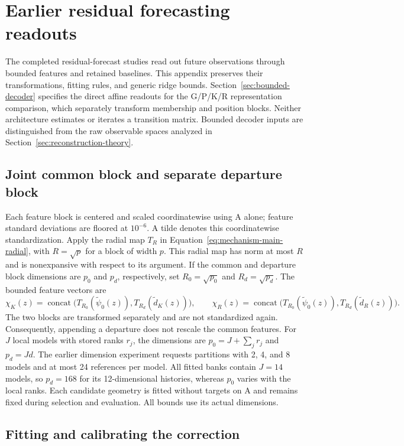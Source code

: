 \section{Earlier residual forecasting readouts}\label{app:earlier-decoders}

The completed residual-forecast studies read out future observations
through bounded features and retained baselines. This appendix preserves
their transformations, fitting rules, and generic ridge bounds.
Section~\ref{sec:bounded-decoder} specifies the direct affine readouts
for the G/P/K/R representation comparison, which separately transform
membership and position blocks. Neither architecture estimates or
iterates a transition matrix. Bounded decoder inputs are distinguished
from the raw observable spaces analyzed in
Section~\ref{sec:reconstruction-theory}.

\subsection{Joint common block and separate departure block}


Each feature block is centered and scaled coordinatewise using A alone;
feature standard deviations are floored at $10^{-6}$. A tilde denotes
this coordinatewise standardization. Apply the radial map
$T_R$ in Equation~\eqref{eq:mechanism-main-radial}, with $R=\sqrt p$
for a block of width $p$.
This radial map has norm at most $R$ and is nonexpansive with respect to
its argument. If the common and departure block dimensions are $p_0$
and $p_d$, respectively, set $R_0=\sqrt{p_0}$ and $R_d=\sqrt{p_d}$.
The bounded feature vectors are
\[
 \chi_K(z)=\operatorname{concat}\bigl(
       T_{R_0}(\widetilde\psi_0(z)),T_{R_d}(\widetilde d_K(z))\bigr),
 \qquad
 \chi_R(z)=\operatorname{concat}\bigl(
       T_{R_0}(\widetilde\psi_0(z)),T_{R_d}(\widetilde d_R(z))\bigr).
\]
The two blocks are transformed separately and are not standardized again.
Consequently, appending a departure does not rescale the common features.
For $J$ local models with stored ranks $r_j$, the dimensions are
$p_0=J+\sum_j r_j$ and $p_d=Jd$. The earlier dimension experiment requests
partitions with 2, 4, and 8 models and at most 24 references per model.
All fitted banks contain $J=14$ models, so $p_d=168$ for its
12-dimensional histories, whereas $p_0$ varies with the local ranks.
Each candidate geometry is fitted without targets on A and remains fixed
during selection and evaluation. All bounds use its actual dimensions.

\subsection{Fitting and calibrating the correction}

